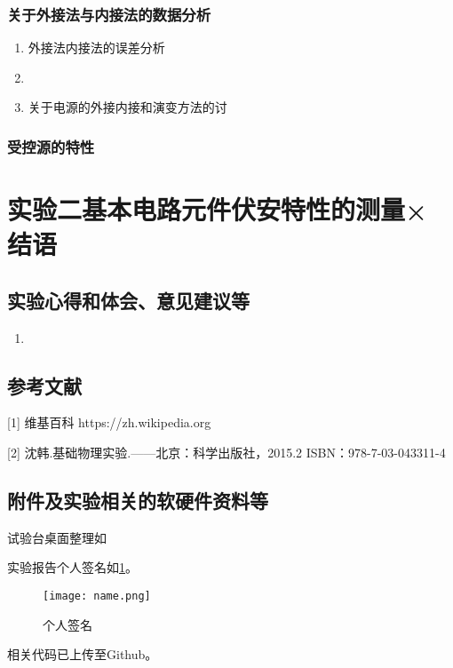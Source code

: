 \documentclass[dvipsnames, svgnames,a4paper,11pt]{article}
\begin{document}
	\subsubsection{关于外接法与内接法的数据分析}
	\begin{enumerate}
		\item 外接法内接法的误差分析
		
		\item 
		
		\item 关于电源的外接内接和演变方法的讨
	\end{enumerate}
	
	
	\subsubsection{受控源的特性}
	
	
	
	
	
	\clearpage
	
	\section{实验二\quad 基本电路元件伏安特性的测量× \quad\heiti 结语}
	
	\subsection{实验心得和体会、意见建议等}
	\begin{enumerate}
		\item 
	\end{enumerate}
	
	\subsection{参考文献}
	[1] 维基百科 https://zh.wikipedia.org
	
	[2] 沈韩.基础物理实验.——北京：科学出版社，2015.2 ISBN：978-7-03-043311-4
	
	
	\subsection{附件及实验相关的软硬件资料等}
	试验台桌面整理如%
	
	实验报告个人签名如\cref{fig:name}。
	
	\begin{figure}[htbp]
		\centering
		\texttt{[image: name.png]}
		\caption{个人签名}
		\label{fig:name}
	\end{figure}
	
	
	相关代码已上传至Github。
	
	
	
\end{document}
